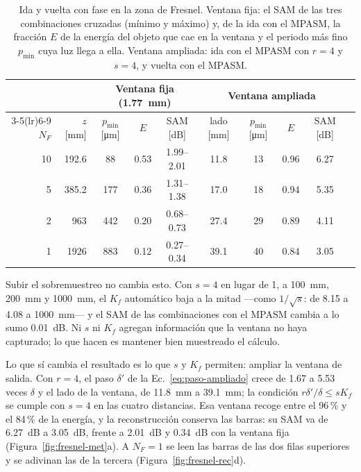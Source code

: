 \begin{table}[htbp]
  \centering
  \small
  \caption[Ida y vuelta en la zona de Fresnel: ventana fija frente a
  ampliada]{Ida y vuelta con fase en la zona de Fresnel. Ventana fija: el SAM
  de las tres combinaciones cruzadas (mínimo y máximo) y, de la ida con el
  MPASM, la fracción $E$ de la energía del objeto que cae en la ventana y el
  periodo más fino $p_\mathrm{min}$ cuya luz llega a ella. Ventana ampliada:
  ida con el MPASM con $r = 4$ y $s = 4$, y vuelta con el MPASM.}
  \label{tab:fresnel}
  \begin{tabular}{rrcccccccc}
    \toprule
    & & \multicolumn{3}{c}{Ventana fija (\SI{1.77}{mm})}
      & \multicolumn{4}{c}{Ventana ampliada} \\
    \cmidrule(lr){3-5}\cmidrule(lr){6-9}
    $N_F$ & $z$ [mm] & $p_\mathrm{min}$ [\si{\micro\metre}] & $E$ & SAM [dB]
      & lado [mm] & $p_\mathrm{min}$ [\si{\micro\metre}] & $E$ & SAM [dB] \\
    \midrule
    10 & 192.6 &  88 & 0.53 & 1.99--2.01 & 11.8 & 13 & 0.96 & 6.27 \\
     5 & 385.2 & 177 & 0.36 & 1.31--1.38 & 17.0 & 18 & 0.94 & 5.35 \\
     2 & 963   & 442 & 0.20 & 0.68--0.73 & 27.4 & 29 & 0.89 & 4.11 \\
     1 & 1926  & 883 & 0.12 & 0.27--0.34 & 39.1 & 40 & 0.84 & 3.05 \\
    \bottomrule
  \end{tabular}
\end{table}

Subir el sobremuestreo no cambia esto. Con $s = 4$ en lugar de 1, a
\SI{100}{mm}, \SI{200}{mm} y \SI{1000}{mm}, el $K_f$ automático baja a la
mitad ---como $1/\sqrt{s}$: de 8.15 a 4.08 a \SI{1000}{mm}--- y el SAM de las
combinaciones con el MPASM cambia a lo sumo \SI{0.01}{dB}. Ni $s$ ni $K_f$
agregan información que la ventana no haya capturado; lo que hacen es mantener
bien muestreado el cálculo.

Lo que sí cambia el resultado es lo que $s$ y $K_f$ permiten: ampliar la
ventana de salida. Con $r = 4$, el paso $\delta'$ de la
Ec.~\eqref{eq:paso-ampliado} crece de 1.67 a 5.53 veces $\delta$ y el lado de
la ventana, de \SI{11.8}{mm} a \SI{39.1}{mm}; la condición
$r\delta'/\delta \le sK_f$ se cumple con $s = 4$ en las cuatro distancias. Esa
ventana recoge entre el 96\,\% y el 84\,\% de la energía, y la reconstrucción
conserva las barras: su SAM va de \SI{6.27}{dB} a \SI{3.05}{dB}, frente a
\SI{2.01}{dB} y \SI{0.34}{dB} con la ventana fija
(Figura~\ref{fig:fresnel-met}a). A $N_F = 1$ se leen las barras de las dos
filas superiores y se adivinan las de la tercera
(Figura~\ref{fig:fresnel-rec}d).

